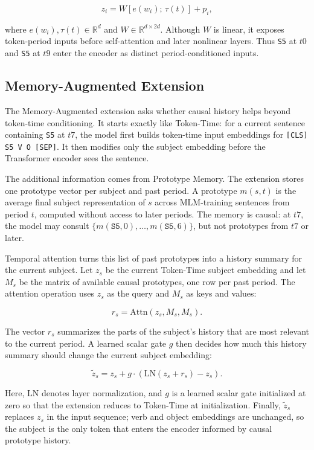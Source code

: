 \documentclass[runningheads]{llncs}
\begin{document}
\[
  z_i = W [e(w_i);\, \tau(t)] + p_i ,
\]

where \(e(w_i), \tau(t) \in \mathbb{R}^d\) and \(W \in \mathbb{R}^{d \times
2d}\). Although \(W\) is linear, it exposes token-period inputs before
self-attention and later nonlinear layers. Thus \texttt{S5} at \(t0\) and
\texttt{S5} at \(t9\) enter the encoder as distinct period-conditioned inputs.

\subsection{Memory-Augmented Extension}
The Memory-Augmented extension asks whether causal history helps beyond token-time
conditioning. It starts exactly like Token-Time: for a current sentence containing
\texttt{S5} at \(t7\), the model first builds token-time input embeddings for
\texttt{[CLS] S5 V O [SEP]}. It then modifies only the subject embedding before
the Transformer encoder sees the sentence.

The additional information comes from Prototype Memory. The extension stores one
prototype vector per subject and past period. A prototype \(m(s,t)\) is the
average final subject representation of \(s\) across MLM-training sentences from period
\(t\), computed without access to later periods. The memory is causal: at \(t7\), the model may consult
\(\{m(\texttt{S5},0),\ldots,m(\texttt{S5},6)\}\), but not prototypes from
\(t7\) or later.

Temporal attention turns this list of past prototypes into a history summary
for the current subject. Let \(z_s\) be the current Token-Time subject embedding and
let \(M_s\) be the matrix of available causal prototypes, one row per past
period. The attention operation uses \(z_s\) as the query and \(M_s\) as keys
and values:

\[
  r_s = \mathrm{Attn}(z_s, M_s, M_s).
\]

The vector \(r_s\) summarizes the parts of the subject's history that are most
relevant to the current period. A learned scalar gate \(g\) then decides how
much this history summary should change the current subject embedding:

\[
  \tilde{z}_s =
  z_s + g \cdot
  \left(\mathrm{LN}(z_s + r_s) - z_s\right).
\]

Here, \(\mathrm{LN}\) denotes layer normalization, and \(g\) is a learned
scalar gate initialized at zero so that the extension reduces to Token-Time at
initialization. Finally, \(\tilde{z}_s\) replaces \(z_s\) in the input
sequence; verb and object embeddings are unchanged, so the subject is the only
token that enters the encoder informed by causal prototype history.
\end{document}
